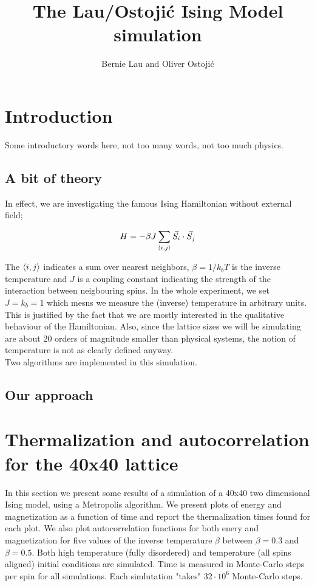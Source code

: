 \documentclass[11pt,a4paper]{article}
\title{The Lau/Ostoji\'c Ising Model simulation}
\date{}
\author{Bernie Lau and Oliver Ostoji\'c}
\DeclarePairedDelimiter{\avg}{\langle}{\rangle}
\begin{document}
\maketitle

\section{Introduction}
{\color{red} Some introductory words here, not too many words, not too much physics.}
\subsection{A bit of theory}
In effect, we are investigating the famous Ising Hamiltonian without external field;

\begin{equation}\label{eq:Hamiltonian}
    H = -\beta J \sum_{\avg*{i,j}} \vec{S}_i \cdot \vec{S}_j
\end{equation}

The $\avg{i,j}$ indicates a sum over nearest neighbors, $\beta = 1/k_bT$ is the inverse temperature and $J$ is a
 coupling constant indicating the strength of the interaction between neigbouring spins. In the whole experiment,
 we set $J = k_b = 1$ which mesns we measure the (inverse) temperature in arbitrary units. This is justified by the
 fact that we are mostly interested in the qualitative behaviour of the Hamiltonian. Also, since the lattice sizes we
 will be simulating are about 20 orders of magnitude smaller than physical systems, the notion of temperature is not 
 as clearly defined anyway. \\
 Two algorithms are implemented in this simulation.

\subsection{Our approach}


\section{Thermalization and autocorrelation for the 40x40 lattice}


In this section we present some results of a simulation of a 40x40 two dimensional Ising model, using a Metropolis algorithm.
 We present plots of energy and magnetization as a function of time and report the thermalization times found for each plot.
 We also plot autocorrelation functions for both enery and magnetization
 for five values of the inverse temperature $\beta$ between $\beta = 0.3$ and $\beta = 0.5$. 
 Both high temperature (fully disordered) and temperature (all spins aligned) initial conditions are simulated.
 Time is measured in Monte-Carlo steps per spin for all simulations. Each simlutation "takes" $32\cdot 10^6$ 
 Monte-Carlo steps.
\end{document}
